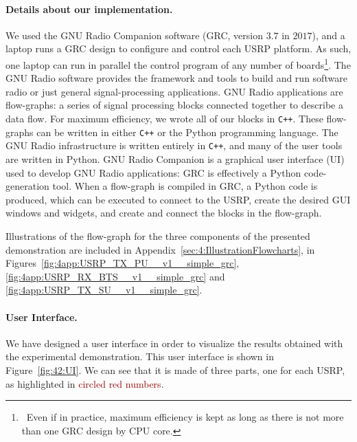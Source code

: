 \paragraph{Details about our implementation.}
%
We used the GNU Radio Companion software (GRC, version $3.7$ in $2017$),
and a laptop runs a GRC design to configure and control each USRP platform.
As such, one laptop can run in parallel the control program of any number of boards\footnote{~Even if in practice, maximum efficiency is kept as long as there is not more than one GRC design by CPU core.}.
%
The GNU Radio software provides the framework and tools to build and run software radio or just general signal-processing applications.
GNU Radio applications are flow-graphs: a series of signal processing blocks connected together to describe a data flow.
For maximum efficiency, we wrote all of our blocks in \texttt{C++}.
These flow-graphs can be written in either \texttt{C++} or the Python programming language. The GNU Radio infrastructure is written entirely in \texttt{C++}, and many of the user tools are written in Python.
GNU Radio Companion is a graphical user interface (UI) used to develop GNU Radio applications:
GRC is effectively a Python code-generation tool.
When a flow-graph is compiled in GRC, a Python code is produced, which can be executed to connect to the USRP,
create the desired GUI windows and widgets, and create and connect the blocks in the flow-graph.

Illustrations of the flow-graph for the three components of the presented demonstration are included in Appendix~\ref{sec:4:IllustrationFlowcharts}, in Figures~\ref{fig:4app:USRP_TX_PU__v1__simple_grc}, \ref{fig:4app:USRP_RX_BTS__v1__simple_grc} and \ref{fig:4app:USRP_TX_SU__v1__simple_grc}.


\paragraph{User Interface.}

We have designed a user interface in order to visualize the results obtained  with the experimental demonstration. This user interface is shown in Figure~\ref{fig:42:UI}.
We can see that it is made of three parts, one for each USRP, as highlighted in \textcolor{darkred}{circled red numbers}.

